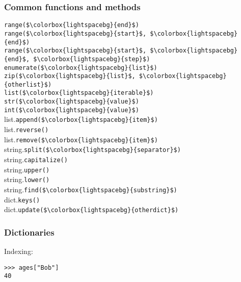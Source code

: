 \documentclass[12pt,twocolumn]{article}
\begin{document}
	\subsubsection*{Common functions and methods}
	
	\lstinline|range($\colorbox{lightspacebg}{end}$)| \\
	\lstinline|range($\colorbox{lightspacebg}{start}$, $\colorbox{lightspacebg}{end}$)| \\
	\lstinline|range($\colorbox{lightspacebg}{start}$, $\colorbox{lightspacebg}{end}$, $\colorbox{lightspacebg}{step}$)| \\
	
	\lstinline|enumerate($\colorbox{lightspacebg}{list}$)| \\
	\lstinline|zip($\colorbox{lightspacebg}{list}$, $\colorbox{lightspacebg}{otherlist}$)| \\
	
	\lstinline|list($\colorbox{lightspacebg}{iterable}$)| \\
	\lstinline|str($\colorbox{lightspacebg}{value}$)| \\
	\lstinline|int($\colorbox{lightspacebg}{value}$)| \\
	
	list.\lstinline|append($\colorbox{lightspacebg}{item}$)| \\
	list.\lstinline|reverse()| \\
	list.\lstinline|remove($\colorbox{lightspacebg}{item}$)| \\
	
	string.\lstinline|split($\colorbox{lightspacebg}{separator}$)| \\
	string.\lstinline|capitalize()| \\
	string.\lstinline|upper()| \\
	string.\lstinline|lower()| \\
	string.\lstinline|find($\colorbox{lightspacebg}{substring}$)| \\
	
	dict.\lstinline|keys()| \\
	dict.\lstinline|update($\colorbox{lightspacebg}{otherdict}$)| \\
	
	\subsubsection*{Dictionaries}
	
	Indexing:
	\begin{lstlisting}
>>> ages["Bob"]
40\end{lstlisting}
\end{document}
